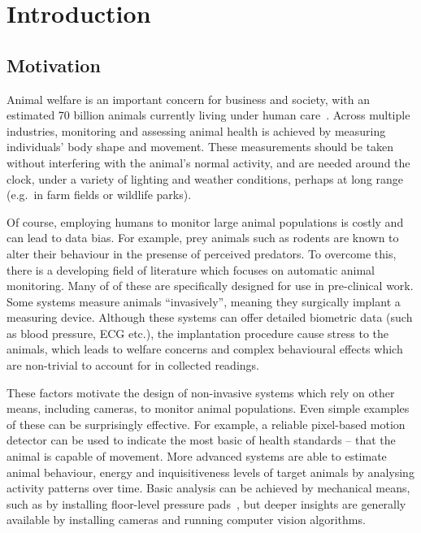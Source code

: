 
\chapter{Introduction}\label{chap:intro}  %

\ifpdf
    \graphicspath{{Chapter1/Figs/Raster/}{Chapter1/Figs/PDF/}{Chapter1/Figs/}}
\else
    \graphicspath{{Chapter1/Figs/Vector/}{Chapter1/Figs/}}
\fi


\section{Motivation} %

Animal welfare is an important concern for business and society, with an estimated 70 billion animals currently living under human care~\cite{FAOSTAT}. Across multiple industries, monitoring and assessing animal health is achieved by measuring individuals' body shape and movement. These measurements should be taken without interfering with the animal's normal activity, and are needed around the clock, under a variety of lighting and weather conditions, perhaps at long range (e.g.\ in farm fields or wildlife parks). 

Of course, employing humans to monitor large animal populations is costly and can lead to data bias. For example, prey animals such as rodents are known to alter their behaviour in the presense of perceived predators. To overcome this, there is a developing field of literature which focuses on automatic animal monitoring. Many of of these are specifically designed for use in pre-clinical work. Some systems measure animals ``invasively'', meaning they surgically implant a measuring device. Although these systems can offer detailed biometric data (such as blood pressure, ECG etc.), the implantation procedure cause stress to the animals, which leads to welfare concerns and complex behavioural effects which are non-trivial to account for in collected readings. 

These factors motivate the design of non-invasive systems which rely on other means, including cameras, to monitor animal populations. Even simple examples of these can be surprisingly effective. For example, a reliable pixel-based motion detector can be used to indicate the most basic of health standards -- that the animal is capable of movement. More advanced systems are able to estimate animal behaviour, energy and inquisitiveness levels of target animals by analysing activity patterns over time. Basic analysis can be achieved by mechanical means, such as by installing floor-level pressure pads~\cite{zammit2010reliability}, but deeper insights are generally available by installing cameras and running computer vision algorithms. 

